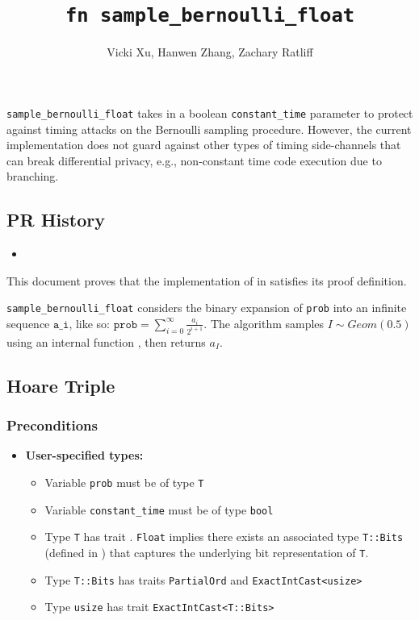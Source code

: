 \documentclass{article}
\title{\texttt{fn sample\_bernoulli\_float}}
\author{Vicki Xu, Hanwen Zhang, Zachary Ratliff}
\begin{document}
\maketitle

\contrib
\begin{tcolorbox}
    \begin{warning}
     \texttt{sample\_bernoulli\_float} takes in a boolean \texttt{constant\_time} parameter to protect against timing attacks on the Bernoulli sampling procedure. However, the current implementation does not guard against other types of timing side-channels that can break differential privacy, e.g., non-constant time code execution due to branching.
    \end{warning}
\end{tcolorbox}

\subsection*{PR History}
\begin{itemize}
    \item {}
\end{itemize}

This document proves that the implementation of  in 
satisfies its proof definition.

\texttt{sample\_bernoulli\_float} considers the binary expansion of \texttt{prob} into an infinite sequence $\texttt{a\_i}$,
like so: $\texttt{prob} = \sum_{i = 0}^{\infty} \frac{a_i}{2^{i + 1}}$.
The algorithm samples $I \sim Geom(0.5)$ using an internal function , then returns $a_I$.

\subsection{Hoare Triple}
\subsubsection*{Preconditions}
\begin{itemize}
    \item \textbf{User-specified types:}
    \begin{itemize}
        \item Variable \texttt{prob} must be of type \texttt{T}
        \item Variable \texttt{constant\_time} must be of type \texttt{bool}
        \item Type \texttt{T} has trait .
            \texttt{Float} implies there exists an associated type \texttt{T::Bits} (defined in ) that captures the underlying bit representation of \texttt{T}.
        \item Type \texttt{T::Bits} has traits \texttt{PartialOrd} and \texttt{ExactIntCast<usize>}
        \item Type \texttt{usize} has trait \texttt{ExactIntCast<T::Bits>}
    \end{itemize}
\end{itemize}
\end{document}
